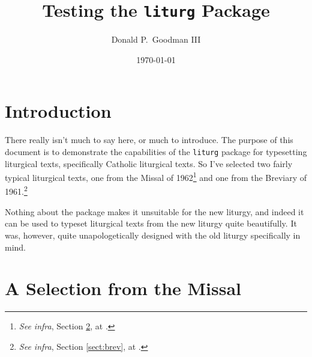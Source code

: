 \documentclass{article}
\title{Testing the \texttt{liturg} Package}
\author{Donald P.\ Goodman III}
\date{\today}
\begin{document}
\maketitle
\tableofcontents

\section{Introduction}
\label{sect:intro}

There really isn't much to say here, or much to introduce.  The
purpose of this document is to demonstrate the capabilities of the
\texttt{liturg} package for typesetting liturgical texts,
specifically Catholic liturgical texts.  So I've selected two
fairly typical liturgical texts, one from the Missal of
1962\footnote{\textit{See infra}, Section \ref{sect:missal}, at
\pageref{sect:missal}.} and one from the Breviary of
1961.\footnote{\textit{See infra}, Section \ref{sect:brev}, at
\pageref{sect:brev}.}

Nothing about the package makes it unsuitable for the new liturgy,
and indeed it can be used to typeset liturgical texts from the new
liturgy quite beautifully.  It was, however, quite unapologetically
designed with the old liturgy specifically in mind.

\section{A Selection from the Missal}
\label{sect:missal}
\end{document}

